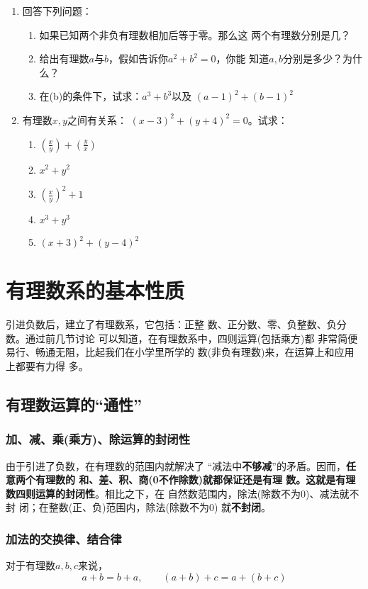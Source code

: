 \begin{enumerate}
	\item  回答下列问题：
	\begin{enumerate}
		\item 如果已知两个非负有理数相加后等于零。那么这
		两个有理数分别是几？
		\item 给出有理数$a$与$b$，假如告诉你$a^2 +b^2=0$，你能
		知道$a, b$分别是多少？为什么？
		\item 在(b)的条件下，试求：$a^3+b^3$以及
		$(a-1)^2+(b-1)^2$
	\end{enumerate}
	
	
	\item  有理数$x,  y$之间有关系：
	$(x-3)^2+(y+4)^2=0$。试求：
	\begin{multicols}{2}
		\begin{enumerate}
			\item $\left(\frac{x}{y}\right)+\left(\frac{y}{x}\right)$
			\item $x^2+y^2$
			\item $\left(\frac{x}{y}\right)^2+1$
			\item $x^3+y^3$
			\item $(x+3)^2+(y-4)^2$
		\end{enumerate}
	\end{multicols}
\end{enumerate}

\section{有理数系的基本性质}
引进负数后，建立了有理数系，它包括：正整
数、正分数、零、负整数、负分数。通过前几节讨论
可以知道，在有理数系中，四则运算(包括乘方)都
非常简便易行、畅通无阻，比起我们在小学里所学的
数(非负有理数)来，在运算上和应用上都要有力得
多。

\subsection{有理数运算的“通性”}
\subsubsection{加、减、乘(乘方)、除运算的封闭性}
由于引进了负数，在有理数的范围内就解决了
“减法中\textbf{不够减}”的矛盾。因而，\textbf{任意两个有理数的
	和、差、积、商(0不作除数)就都保证还是有理
	数。这就是有理数四则运算的封闭性}。相比之下，在
自然数范围内，除法(除数不为0)、减法就不封
闭；在整数(正、负)范围内，除法(除数不为0)
就\textbf{不封闭}。

\subsubsection{加法的交换律、结合律}
\begin{blk}{}
	对于有理数$a,b,c$来说，
	\[a+b=b+a,\qquad (a+b)+c=a+(b+c)\]
\end{blk}

